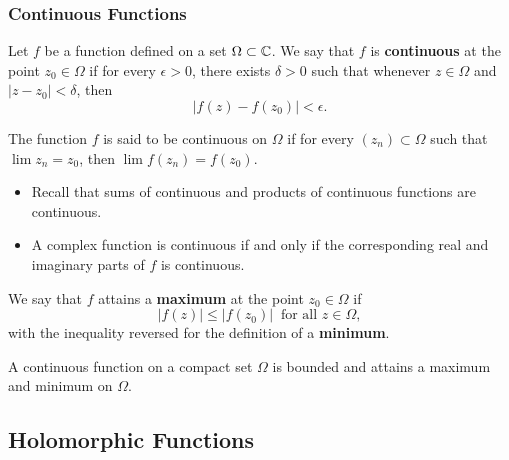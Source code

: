 \documentclass[11pt,a4paper]{book}
\begin{document}
\subsubsection{Continuous Functions}

\begin{definition}[Continuity]
    Let \( f  \) be a function defined on a set \( \Omega \subset \mathbb{C}   \). We say that \( f  \) is \textbf{continuous} at the point \( {z}_{0} \in \Omega  \) if for every \( \epsilon > 0  \), there exists \( \delta > 0  \) such that whenever \( z \in \Omega  \) and \( | z - {z}_{0} |  < \delta  \), then 
    \[  | f(z) - f({z}_{0}) | < \epsilon. \]
\end{definition}

\begin{definition}
    The function \( f  \) is said to be continuous on \( \Omega  \) if for every \( ({z}_{n}) \subset \Omega  \) such that \( \lim {z}_{n} = {z}_{0} \), then \( \lim f({z}_{n})  = f({z}_{0})\).
\end{definition}

\begin{itemize}
    \item Recall that sums of continuous and products of continuous functions are continuous.
    \item A complex function is continuous if and only if the corresponding real and imaginary parts of \( f  \) is continuous.
\end{itemize}

\begin{definition}
    We say that \( f  \) attains a \textbf{maximum} at the point \( {z}_{0} \in \Omega  \) if 
    \[  | f(z) |  \leq | f({z}_{0}) | \ \text{ for all } z \in \Omega,  \]
    with the inequality reversed for the definition of a \textbf{minimum}.

\end{definition}

\begin{theorem}
    A continuous function on a compact set \( \Omega  \) is bounded and attains a maximum and minimum on \( \Omega  \).
\end{theorem}

\subsection{Holomorphic Functions}
\end{document}
